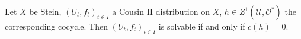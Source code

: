Let $X$ be Stein, $(U_t, f_t)_{t \in I}$ a Cousin II distribution on $X$, $h \in Z^1(\mathcal{U}, \mathcal{O}^*)$ the corresponding cocycle. Then $(U_t, f_t)_{t \in I}$ is solvable if and only if $c(h) = 0$.
